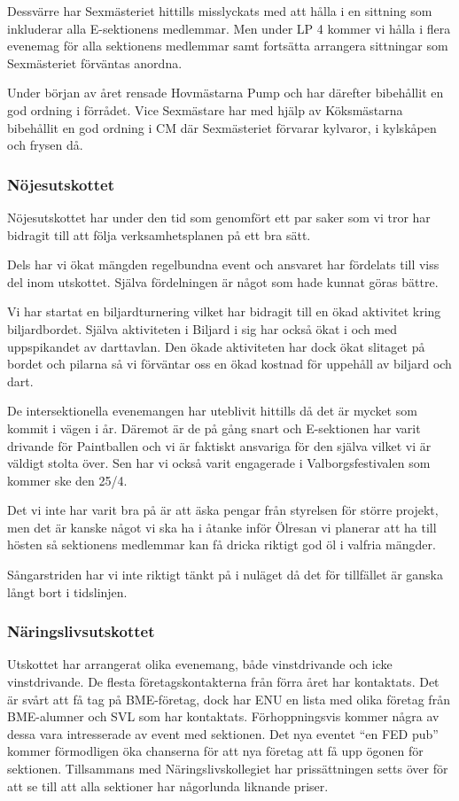 \documentclass[../_main/handlingar.tex]{subfiles}
\begin{document}
Dessvärre har Sexmästeriet hittills misslyckats med att hålla i en sittning som inkluderar alla E-sektionens medlemmar. Men under LP 4 kommer vi hålla i flera evenemag för alla sektionens medlemmar samt fortsätta arrangera sittningar som Sexmästeriet förväntas anordna.

Under början av året rensade Hovmästarna Pump och har därefter bibehållit en god ordning i förrådet. Vice Sexmästare har med hjälp av Köksmästarna bibehållit en god ordning i CM där Sexmästeriet förvarar kylvaror, i kylskåpen och frysen då.

\subsubsection*{Nöjesutskottet}
Nöjesutskottet har under den tid som genomfört ett par saker som vi tror har bidragit till att följa verksamhetsplanen på ett bra sätt.
\begin{dashlist}
    \item Dels har vi ökat mängden regelbundna event och ansvaret har fördelats till viss del inom utskottet. Själva fördelningen är något som hade kunnat göras bättre.
    \item Vi har startat en biljardturnering vilket har bidragit till en ökad aktivitet kring biljardbordet. Själva aktiviteten i Biljard i sig har också ökat i och med uppspikandet av darttavlan. Den ökade aktiviteten har dock ökat slitaget på bordet och pilarna så vi förväntar oss en ökad kostnad för uppehåll av biljard och dart.
    \item De intersektionella evenemangen har uteblivit hittills då det är mycket som kommit i vägen i år. Däremot är de på gång snart och E-sektionen har varit drivande för Paintballen och vi är faktiskt ansvariga för den själva vilket vi är väldigt stolta över. Sen har vi också varit engagerade i Valborgsfestivalen som kommer ske den 25/4. 
\end{dashlist}

Det vi inte har varit bra på är att äska pengar från styrelsen för större projekt, men det är kanske något vi ska ha i åtanke inför Ölresan vi planerar att ha till hösten så sektionens medlemmar kan få dricka riktigt god öl i valfria mängder. 

Sångarstriden har vi inte riktigt tänkt på i nuläget då det för tillfället är ganska långt bort i tidslinjen. 

\subsubsection*{Näringslivsutskottet}
Utskottet har arrangerat olika evenemang, både vinstdrivande och icke vinstdrivande. De flesta företagskontakterna från förra året har kontaktats. Det är svårt att få tag på BME-företag, dock har ENU en lista med olika företag från BME-alumner och SVL som har kontaktats. Förhoppningsvis kommer några av dessa vara intresserade av event med sektionen. Det nya eventet “en FED pub” kommer förmodligen öka chanserna för att nya företag att få upp ögonen för sektionen.
Tillsammans med Näringslivskollegiet har prissättningen setts över för att se till att alla sektioner har någorlunda liknande priser.
\end{document}
